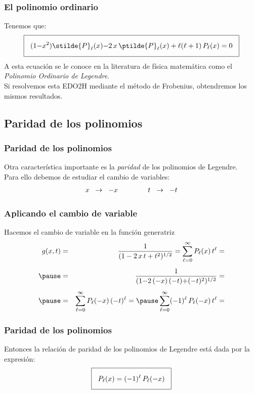 \begin{frame}
\frametitle{El polinomio ordinario}
Tenemos que:
\begin{align*}
\setlength{\fboxsep}{3\fboxsep}\boxed{
(1 {-} x^{2}) \stilde{P}_\ell (x) {-} 2 \, x \, \ptilde{P}_\ell (x) + \ell (\ell + 1) \, P_{\ell} (x) = 0
}
\end{align*}
\pause
A esta ecuación se le conoce en la literatura de física matemática como el \emph{Polinomio Ordinario de Legendre}.
\\
\bigskip
\pause
Si resolvemos esta EDO2H mediante el método de Frobenius, obtendremos los mismos resultados.
\end{frame}
\subsection{Paridad de los polinomios}
\begin{frame}
\frametitle{Paridad de los polinomios}
Otra característica importante es la \emph{paridad} de los polinomios de Legendre.
\\
\bigskip
\pause
Para ello debemos de estudiar el cambio de variables:
\begin{align*}
x \hspace{0.2cm} \rightarrow \hspace{0.2cm} - x \hspace{1.5cm} t \hspace{0.2cm} \rightarrow \hspace{0.2cm} - t
\end{align*}
\end{frame}
\begin{frame}
\frametitle{Aplicando el cambio de variable}
Hacemos el cambio de variable en la función generatriz
\begin{eqnarray*}
g(x, t) &=& \dfrac{1}{(1 - 2 \, x \, t + t^{2})^{1/2}} = \sum_{\ell=0}^{\infty} P_{\ell} (x) \, t^{\ell} = \\[0.5em] \pause
&=& \dfrac{1}{(1 {-} 2 \, (-x) \, (-t) {+} (-t)^{2})^{1/2}} = \\[0.5em] \pause
&=& \sum_{\ell=0}^{\infty} P_{\ell} (-x) \, (-t)^{\ell} = \pause \sum_{\ell=0}^{\infty} (-1)^{\ell} \, P_{\ell} (-x) \, t^{\ell} = 
\end{eqnarray*}
\end{frame}
\begin{frame}
\frametitle{Paridad de los polinomios}
Entonces la relación de paridad de los polinomios de Legendre está dada por la expresión:
\begin{align*}
\setlength{\fboxsep}{3\fboxsep}\boxed{
P_{\ell}(x) = (-1)^{\ell} \, P_\ell(-x)
}
\end{align*}
\end{frame}

